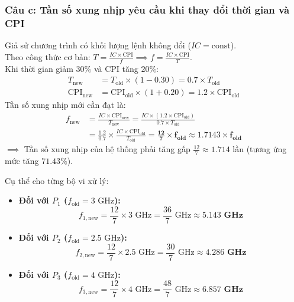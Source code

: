 \documentclass[a4paper]{article}
\numberwithin{figure}{section}
\numberwithin{table}{section}
\begin{document}
\subsubsection*{Câu c: Tần số xung nhịp yêu cầu khi thay đổi thời gian và CPI}
Giả sử chương trình có khối lượng lệnh không đổi ($IC = \text{const}$).\\
Theo công thức cơ bản: $T = \frac{IC \times \text{CPI}}{f} \implies f = \frac{IC \times \text{CPI}}{T}$.\\
Khi thời gian giảm $30\%$ và CPI tăng $20\%$:
\begin{align*}
    T_{\text{new}} &= T_{\text{old}} \times (1 - 0.30) = 0.7 \times T_{\text{old}} \\
    \text{CPI}_{\text{new}} &= \text{CPI}_{\text{old}} \times (1 + 0.20) = 1.2 \times \text{CPI}_{\text{old}}
\end{align*}
Tần số xung nhịp mới cần đạt là:
\begin{align*}
    f_{\text{new}} &= \frac{IC \times \text{CPI}_{\text{new}}}{T_{\text{new}}} = \frac{IC \times (1.2 \times \text{CPI}_{\text{old}})}{0.7 \times T_{\text{old}}} \\
    &= \frac{1.2}{0.7} \times \frac{IC \times \text{CPI}_{\text{old}}}{T_{\text{old}}} = \mathbf{\frac{12}{7} \times f_{\text{old}}} \approx \mathbf{1.7143 \times f_{\text{old}}}
\end{align*}
$\implies$ Tần số xung nhịp của hệ thống phải tăng gấp $\frac{12}{7} \approx 1.714$ lần (tương ứng mức tăng $\mathbf{71.43\%}$).

Cụ thể cho từng bộ vi xử lý:
\begin{itemize}[leftmargin=*]
    \item \textbf{Đối với $P_1$ ($f_{\text{old}} = 3\text{ GHz}$):}
    \begin{equation*}
        f_{1,\text{new}} = \frac{12}{7} \times 3\text{ GHz} = \frac{36}{7}\text{ GHz} \approx \mathbf{5.143\text{ GHz}}
    \end{equation*}
    \item \textbf{Đối với $P_2$ ($f_{\text{old}} = 2.5\text{ GHz}$):}
    \begin{equation*}
        f_{2,\text{new}} = \frac{12}{7} \times 2.5\text{ GHz} = \frac{30}{7}\text{ GHz} \approx \mathbf{4.286\text{ GHz}}
    \end{equation*}
    \item \textbf{Đối với $P_3$ ($f_{\text{old}} = 4\text{ GHz}$):}
    \begin{equation*}
        f_{3,\text{new}} = \frac{12}{7} \times 4\text{ GHz} = \frac{48}{7}\text{ GHz} \approx \mathbf{6.857\text{ GHz}}
    \end{equation*}
\end{itemize}
\end{document}
